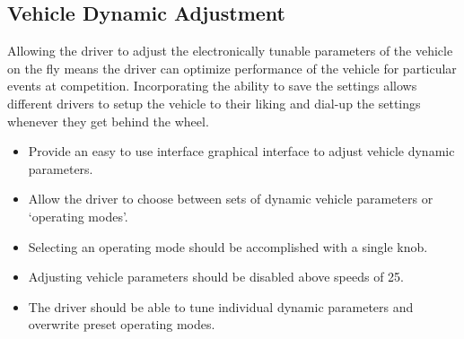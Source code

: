 \subsection{Vehicle Dynamic Adjustment}

Allowing the driver to adjust the electronically tunable parameters of the vehicle on the fly means the driver can optimize performance of the vehicle for particular events at competition. Incorporating the ability to save the settings allows different drivers to setup the vehicle to their liking and dial-up the settings whenever they get behind the wheel.

\begin{itemize}
\item Provide an easy to use interface graphical interface to adjust vehicle dynamic parameters.
\item Allow the driver to choose between sets of dynamic vehicle parameters or `operating modes'.
\item Selecting an operating mode should be accomplished with a single knob.
\item Adjusting vehicle parameters should be disabled above speeds of \unit{25}{\kilo\metre\per\hour}.
\item The driver should be able to tune individual dynamic parameters and overwrite preset operating modes.
\end{itemize}
